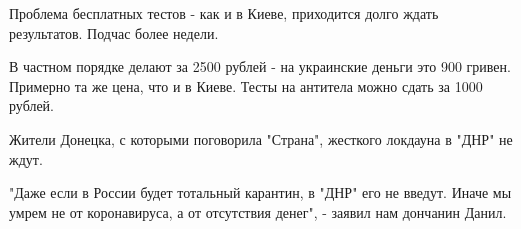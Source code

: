 Проблема бесплатных тестов - как и в Киеве, приходится долго ждать результатов.
Подчас более недели. 

В частном порядке делают за 2500 рублей - на украинские деньги это 900 гривен.
Примерно та же цена, что и в Киеве. Тесты на антитела можно сдать за 1000
рублей. 

Жители Донецка, с которыми поговорила "Страна",  жесткого локдауна в "ДНР" не
ждут.

"Даже если в России будет тотальный карантин, в "ДНР" его не введут. Иначе мы
умрем не от коронавируса, а от отсутствия денег", - заявил нам дончанин Данил. 
